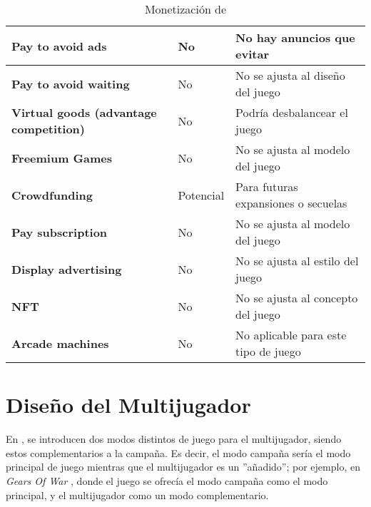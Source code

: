 \begin{table}[H]
{\begin{tabular}{@{}|l|l|l|@{}}
            \textbf{Pay to avoid ads}                      & No                     & No hay anuncios que evitar                                         \\ \midrule
            \textbf{Pay to avoid waiting}                  & No                     & No se ajusta al diseño del juego                                   \\ \midrule
            \textbf{Virtual goods (advantage competition)} & No                     & Podría desbalancear el juego                                       \\ \midrule
            \textbf{Freemium Games}                        & No                     & No se ajusta al modelo del juego                                   \\ \midrule
            \textbf{Crowdfunding}                          & Potencial              & Para futuras expansiones o secuelas                                \\ \midrule
            \textbf{Pay subscription}                      & No                     & No se ajusta al modelo del juego                                   \\ \midrule
            \textbf{Display advertising}                   & No                     & No se ajusta al estilo del juego                                   \\ \midrule
            \textbf{NFT}                                   & No                     & No se ajusta al concepto del juego                                 \\ \midrule
            \textbf{Arcade machines}                       & No                     & No aplicable para este tipo de juego                               \\ \bottomrule
        \end{tabular}%
        }
        \caption{Monetización de \gameTitle}
        \label{tab:monetization}
    \end{table}

\newpage

\section{Diseño del Multijugador} \label{multiplayer}
    En \gameTitle, se introducen dos modos distintos de juego para el multijugador, siendo estos complementarios a la campaña. Es decir, el modo campaña sería el modo principal de juego mientras que el multijugador es un ''añadido''; por ejemplo, en \textit{Gears Of War} \cite{gearsofwar2006}, donde el juego se ofrecía el modo campaña como el modo principal, y el multijugador como un modo complementario.

